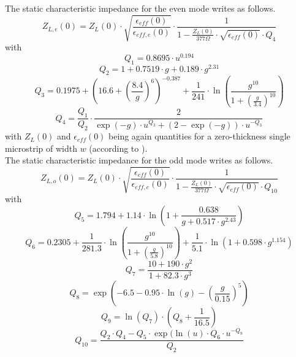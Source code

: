 \documentclass[10pt]{report}
\begin{document}
The static characteristic impedance for the even mode writes as follows.
\begin{equation}
Z_{L,e}(0) = Z_L(0)\cdot \sqrt{\frac{\epsilon_{eff}(0)}{\epsilon_{eff,e}(0)}} \cdot
             \frac{1}{1 - \frac{Z_L(0)}{377\Omega} \cdot \sqrt{\epsilon_{eff}(0)} \cdot Q_4}
\end{equation}
with
\begin{equation}
Q_1 = 0.8695\cdot u^0.194
\end{equation}
\begin{equation}
Q_2 = 1 + 0.7519\cdot g + 0.189\cdot g^2.31
\end{equation}
\begin{equation}
Q_3 = 0.1975 + \left( 16.6 + \left( \frac{8.4}{g} \right) ^6 \right) ^{-0.387}
     + \frac{1}{241} \cdot \ln\left( \frac{g^{10}}{1+\left( \frac{g}{3.4}\right) ^{10}} \right)
\end{equation}
\begin{equation}
Q_4 = \frac{Q_1}{Q_2}\cdot \frac{2}{ \exp(-g)\cdot u^{Q_3} + (2-\exp(-g))\cdot u^{-Q_3} }
\end{equation}
with $Z_L(0)$ and $\epsilon_{eff}(0)$  being again quantities for
a zero-thickness single microstrip of width $w$ (according to
\cite{Hammerstad}).\\
The static characteristic impedance for the odd mode writes as follows.
\begin{equation}
Z_{L,o}(0) = Z_L(0)\cdot \sqrt{\frac{\epsilon_{eff}(0)}{\epsilon_{eff,e}(0)}} \cdot
             \frac{1}{1 - \frac{Z_L(0)}{377\Omega} \cdot \sqrt{\epsilon_{eff}(0)} \cdot Q_{10}}
\end{equation}
with
\begin{equation}
Q_5 = 1.794 +1.14\cdot\ln\left( 1 + \frac{0.638}{g+0.517\cdot g^{2.43}} \right)
\end{equation}
\begin{equation}
Q_6 = 0.2305 + \frac{1}{281.3}\cdot \ln\left( \frac{g^{10}}{1+\left( \frac{g}{5.8}\right) ^{10}} \right)
     + \frac{1}{5.1}\cdot \ln(1+0.598\cdot g^{1.154})
\end{equation}
\begin{equation}
Q_7 = \frac{10+190\cdot g^2}{1+82.3\cdot g^3}
\end{equation}
\begin{equation}
Q_8 = \exp\left( -6.5 - 0.95\cdot\ln(g) - \left(\frac{g}{0.15}\right)^5 \right)
\end{equation}
\begin{equation}
Q_9 = \ln(Q_7)\cdot \left( Q_8 + \frac{1}{16.5} \right)
\end{equation}
\begin{equation}
Q_{10} = \frac{Q_2\cdot Q_4 - Q_5\cdot\exp( \ln(u)\cdot Q_6\cdot u^{-Q_9}}{Q_2}
\end{equation}
\end{document}
